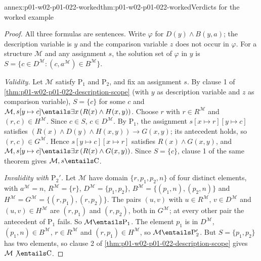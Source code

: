 \begin{annexitem}{annex:p01-w02-p01-022-worked}{thm:p01-w02-p01-022-worked}{Verdicts for the worked example}
\begin{proof}
All three formulas are sentences. Write \(\varphi\) for
\(D(y)\land B(y,a)\); the description variable is \(y\) and the comparison
variable \(z\) does not occur in \(\varphi\). For a structure \(\mathcal M\)
and any assignment \(s\), the solution set of \(\varphi\) in \(y\) is
\(S=\{c\in D^{\mathcal M}:(c,a^{\mathcal M})\in B^{\mathcal M}\}\).

\emph{Validity.} Let \(\mathcal M\) satisfy \(\mathrm{P}_1\) and
\(\mathrm{P}_2\), and fix an assignment \(s\). By clause 1 of
\cref{thm:p01-w02-p01-022-description-scope} (with \(y\) as description
variable and \(z\) as comparison variable), \(S=\{c\}\) for some \(c\) and
\(\mathcal M,s[y\mapsto c]\entails\exists x\,(R(x)\land H(x,y))\). Choose
\(r\) with \(r\in R^{\mathcal M}\) and \((r,c)\in H^{\mathcal M}\). Since
\(c\in S\), \(c\in D^{\mathcal M}\). By \(\mathrm{P}_1\), the assignment
\(s[x\mapsto r][y\mapsto c]\) satisfies
\((R(x)\land D(y)\land H(x,y))\to G(x,y)\); its antecedent holds, so
\((r,c)\in G^{\mathcal M}\). Hence \(s[y\mapsto c][x\mapsto r]\) satisfies
\(R(x)\land G(x,y)\), and \(\mathcal M,s[y\mapsto c]\entails
\exists x\,(R(x)\land G(x,y))\). Since \(S=\{c\}\), clause 1 of the same
theorem gives \(\mathcal M,s\entails\mathrm{C}\).

\emph{Invalidity with \(\mathrm{P}_2'\).} Let \(\mathcal M\) have domain
\(\{r,p_1,p_2,n\}\) of four distinct elements, with \(a^{\mathcal M}=n\),
\(R^{\mathcal M}=\{r\}\), \(D^{\mathcal M}=\{p_1,p_2\}\),
\(B^{\mathcal M}=\{(p_1,n),(p_2,n)\}\) and
\(H^{\mathcal M}=G^{\mathcal M}=\{(r,p_1),(r,p_2)\}\). The pairs \((u,v)\)
with \(u\in R^{\mathcal M}\), \(v\in D^{\mathcal M}\) and
\((u,v)\in H^{\mathcal M}\) are \((r,p_1)\) and \((r,p_2)\), both in
\(G^{\mathcal M}\); at every other pair the antecedent of \(\mathrm{P}_1\)
fails. So \(\mathcal M\entails\mathrm{P}_1\). The element \(p_1\) is in
\(D^{\mathcal M}\), \((p_1,n)\in B^{\mathcal M}\), \(r\in R^{\mathcal M}\)
and \((r,p_1)\in H^{\mathcal M}\), so \(\mathcal M\entails\mathrm{P}_2'\).
But \(S=\{p_1,p_2\}\) has two elements, so clause 2 of
\cref{thm:p01-w02-p01-022-description-scope} gives
\(\mathcal M\not\entails\mathrm{C}\).
\end{proof}
\end{annexitem}
